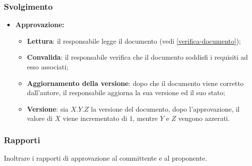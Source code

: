 \subsubsection*{Svolgimento}
\begin{itemize}
	\item \textbf{Approvazione:}
		\begin{itemize}
			\item \textbf{Lettura}: il responsabile legge il
					documento (vedi \cref{verifica-documento});

			\item \textbf{Convalida}: il responsabile verifica che il
					documento soddisfi i requisiti ad esso associati;

			\item \textbf{Aggiornamento della versione}: dopo che il documento
					viene corretto dall'autore, il responsabile aggiorna la
					sua versione ed il suo stato;

			\item \textbf{Versione}: sia $X.Y.Z$ la versione del documento,
					dopo l'approvazione, il valore di $X$ viene incrementato di
					$1$, mentre $Y$ e $Z$ vengono azzerati.
		\end{itemize}
\end{itemize}
	  

\subsubsection{Rapporti} 
Inoltrare i rapporti di approvazione al committente e al proponente.
